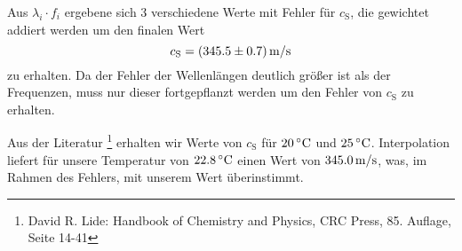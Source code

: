 Aus $\lambda_i \cdot f_i$ ergebene sich 3 verschiedene Werte mit Fehler für $c_\mathrm{S}$, die gewichtet addiert werden um den finalen Wert
\[
	c_\mathrm{S} = \unit[(345.5 \pm 0.7)]{m/s}
\]
zu erhalten.
Da der Fehler der Wellenlängen deutlich größer ist als der Frequenzen, muss nur dieser fortgepflanzt werden um den Fehler von $c_\mathrm{S}$ zu erhalten. 


Aus der Literatur%
\footnote{David R. Lide: Handbook of Chemistry and Physics, CRC Press, 85. Auflage, Seite 14-41}
erhalten wir Werte von $c_\mathrm{S}$ für $\unit[20]{ ^\circ C}$ und $\unit[25]{ ^\circ C}$. Interpolation liefert für unsere Temperatur von $\unit[22.8]{ ^\circ C}$ einen Wert von $\unit[345.0]{m/s}$, was, im Rahmen des Fehlers, mit unserem Wert überinstimmt.


